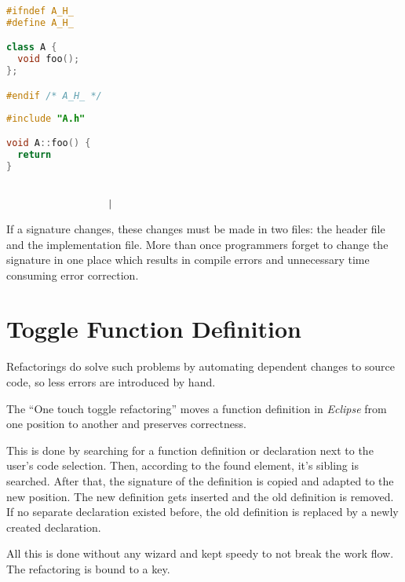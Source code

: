 \vspace{0.5cm}
\begin{minipage}{.468\textwidth}
\lstset{xrightmargin=0.55cm}
\begin{lstlisting}[caption={Header file with a\newline declaration},
label={twofile1}, language=C++]
#ifndef A_H_
#define A_H_

class A {
  void foo();
};

#endif /* A_H_ */
\end{lstlisting}
\end{minipage}%
\begin{minipage}{.492\textwidth}
\lstset{xleftmargin=0.55cm}
\begin{lstlisting}[caption={Source file containing definition},
label={twofile2}, language=C++ ]
#include "A.h"

void A::foo() {
  return
}


	              |
\end{lstlisting}
\end{minipage}

If a signature changes, these changes must be made in two files: the header file
and the implementation file. More than once programmers forget to change the
signature in one place which results in compile errors and unnecessary time
consuming error correction.

\section*{Toggle Function Definition}

Refactorings do solve such problems by automating dependent changes to source
code, so
less errors are introduced by hand.

The ``One touch toggle refactoring'' moves a function definition in
\textit{Eclipse} from one position to another and preserves correctness.

This is done by searching for a function definition or declaration next to the
user's code selection. Then, according to the found
element, it's sibling is searched. After that, the signature of the definition is
copied and adapted to the new position. The new definition gets inserted and
the old definition is removed.
If no separate declaration existed before, the old definition is replaced by a 
newly created declaration.

All this is done without any wizard and kept speedy to not break the work flow.
The refactoring is bound to a key.

